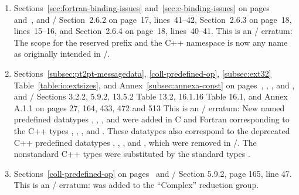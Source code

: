\begin{enumerate}

\item 
Sections~\ref{sec:fortran-binding-issues} and~\ref{sec:c-binding-issues} 
on pages~\pageref{sec:fortran-binding-issues} and~\pageref{sec:c-binding-issues}, and
\MPIIIDOTII/ Section~2.6.2 on page~17, lines~41--42, 
Section~2.6.3 on page~18, lines~15--16, and 
Section~2.6.4 on page~18, lines~40--41.
\newline 
This is an \MPIII/ erratum: 
The scope for the reserved prefix  and 
the C++ namespace  is now any name as originally intended in \MPII/. 

\item 
Sections~\ref{subsec:pt2pt-messagedata},
\ref{coll-predefined-op},
\ref{subsec:ext32} Table~\ref{table:io:extsizes},
and Annex~\ref{subsec:annexa-const} 
on pages~\pageref{subsec:pt2pt-messagedata},
\pageref{coll-predefined-op},
\pageref{table:io:extsizes}, 
and \pageref{subsec:annexa-const}, and
\MPIIIDOTII/ Sections 3.2.2, 5.9.2, 13.5.2 Table 13.2, 16.1.16 Table 16.1, and Annex A.1.1 on pages 27, 164, 433, 472 and 513
\newline 
This is an \MPIIIDOTII/ erratum: 
New named predefined datatypes , , 
, and  were added
in C and Fortran corresponding to the C++ types 
, , , and . 
These datatypes also correspond to the deprecated C++ predefined datatypes 
, , , and ,
which were removed in \MPIIIIDOTO/. 
The nonstandard C++ types  were substituted by the standard types .  

\item 
Sections~\ref{coll-predefined-op} on pages~\pageref{coll-predefined-op} and
\MPIIIDOTII/ Section 5.9.2, page 165, line 47.
\newline 
This is an \MPIIIDOTII/ erratum: 
 was added to the ``Complex'' reduction group. 


\end{enumerate}

